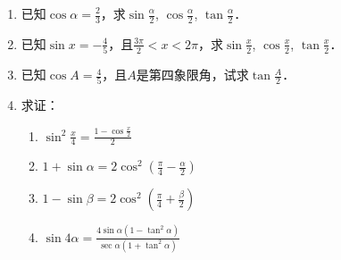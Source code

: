 \begin{ex}
\begin{enumerate}
    \item 已知$\cos\alpha=\frac{2}{3}$，求$\sin\frac{\alpha}{2}$, $\cos \frac{\alpha}{2}$, $\tan \frac{\alpha}{2}$．
    \item 已知$\sin x=-\frac{4}{5}$，且$\frac{3\pi}{2}<x<2\pi$，求$\sin\frac{x}{2}$, $\cos \frac{x}{2}$, $\tan \frac{x}{2}$．
    \item 已知$\cos A=\frac{4}{5}$，且$A$是第四象限角，试求$\tan\frac{A}{2}$．
    \item 求证：
    \begin{multicols}{2}
\begin{enumerate}
    \item $\sin^2\frac{x}{4}=\frac{1-\cos\frac{x}{2}}{2}$
    \item $1+\sin\alpha=2\cos^2\left(\frac{\pi}{4}-\frac{\alpha}{2}\right)$
    \item $1-\sin\beta=2\cos^2\left(\frac{\pi}{4}+\frac{\beta}{2}\right)$
\item $\sin 4\alpha=\frac{4\sin\alpha(1-\tan^2\alpha)}{\sec\alpha(1+\tan^2\alpha)}$
\end{enumerate}        
    \end{multicols}
\end{enumerate}    
\end{ex}

